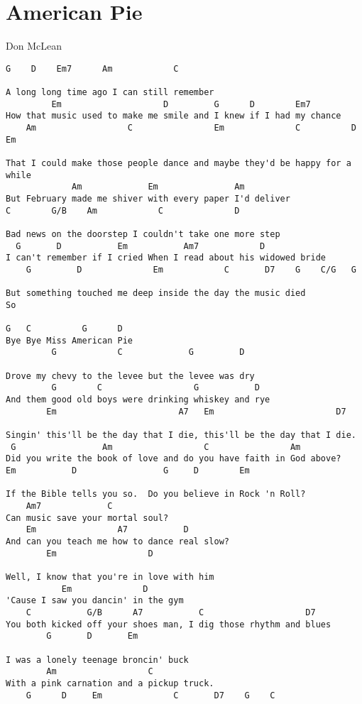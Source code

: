 \section{American Pie} \label{sec:song9}
Don McLean
\begin{verbatim}
G    D    Em7      Am            C 

A long long time ago I can still remember 
         Em                    D         G      D        Em7 
How that music used to make me smile and I knew if I had my chance 
    Am                  C                Em              C          D   Em 

That I could make those people dance and maybe they'd be happy for a while 
             Am             Em               Am 
But February made me shiver with every paper I'd deliver 
C        G/B    Am            C              D 

Bad news on the doorstep I couldn't take one more step 
  G       D           Em           Am7            D 
I can't remember if I cried When I read about his widowed bride 
    G         D              Em            C       D7    G    C/G   G 

But something touched me deep inside the day the music died          So 

G   C          G      D 
Bye Bye Miss American Pie 
         G            C             G         D 

Drove my chevy to the levee but the levee was dry 
         G        C                  G           D 
And them good old boys were drinking whiskey and rye 
        Em                        A7   Em                        D7 

Singin' this'll be the day that I die, this'll be the day that I die. 
 G                 Am                  C                Am 
Did you write the book of love and do you have faith in God above? 
Em           D                 G     D        Em 

If the Bible tells you so.  Do you believe in Rock 'n Roll? 
    Am7             C 
Can music save your mortal soul?  
    Em                A7           D 
And can you teach me how to dance real slow? 
        Em                  D 

Well, I know that you're in love with him  
           Em              D 
'Cause I saw you dancin' in the gym 
    C           G/B      A7           C                    D7 
You both kicked off your shoes man, I dig those rhythm and blues 
        G       D       Em 

I was a lonely teenage broncin' buck  
        Am                  C 
With a pink carnation and a pickup truck. 
    G      D     Em              C       D7    G    C 


\end{verbatim}
